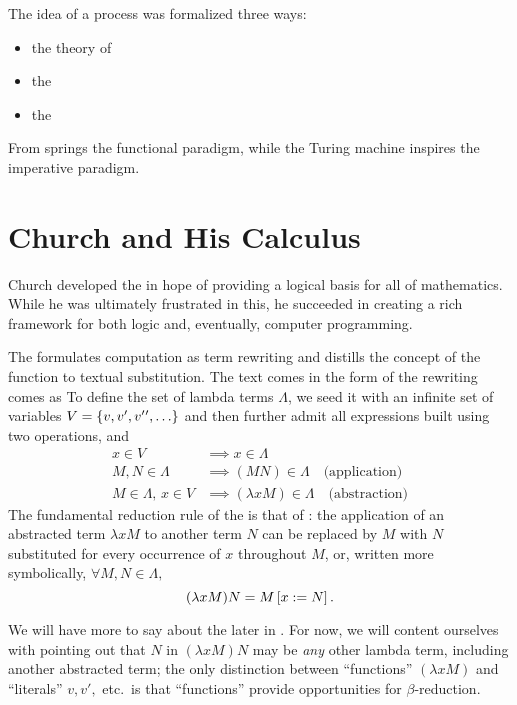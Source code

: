 The idea of a process was formalized three ways:
\begin{itemize}
\item the theory of 
\item the \vocab{\lambdacalc}
\item the 
\end{itemize}
From \lambdacalc springs the functional paradigm, while the Turing machine inspires the imperative paradigm. %

\section{Church and His Calculus}
Church developed the \lambdacalc in hope of providing a logical basis for all of mathematics. While he was ultimately frustrated in this, he succeeded in creating a rich framework for both logic and, eventually, computer programming.

The \lambdacalc formulates computation as term rewriting and distills the concept of the function to textual substitution. The text comes in the form of  the rewriting comes as  To define the set of lambda terms $\Lambda$, we seed it with an infinite set of variables $V = \set{v, v\prime, v\prime\prime, \dotsc}$ and then further admit all expressions built using two operations,  and 
\begin{align*}
x \in V &\implies x \in \Lambda\\
M,N \in \Lambda &\implies (MN) \in \Lambda \quad\text{(application)}\\
M \in \Lambda,\, x \in V &\implies (\lambda x M) \in \Lambda \quad\text{(abstraction)}
\end{align*}
The fundamental reduction rule of the \lambdacalc is that of : the application of an abstracted term $\lambda x M$ to another term $N$ can be replaced by $M$ with $N$ substituted for every occurrence of $x$ throughout $M$, or, written more symbolically, $\forall M,N \in \Lambda,$
\[
(\lambda x M)N = \replace{x}{N}{M}.
\]

We will have more to say about the \lambdacalc later in . For now, we will content ourselves with pointing out that $N$ in $(\lambda x M)N$ may be \emph{any} other lambda term, including another abstracted term; the only distinction between ``functions'' $(\lambda x M)$ and ``literals'' $v, v\prime,$ etc.\ is that ``functions'' provide opportunities for $\beta$-reduction.

